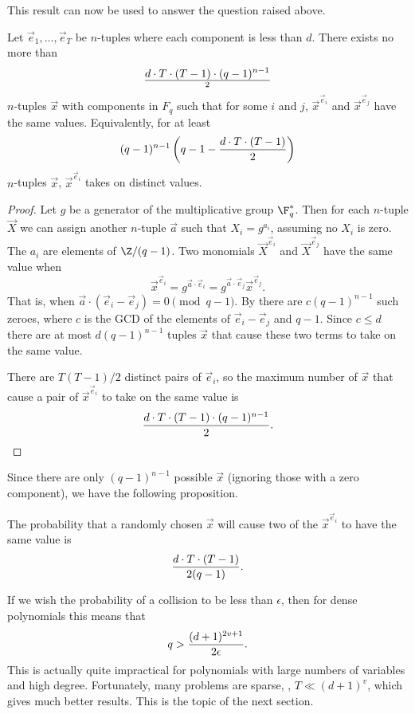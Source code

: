 This result can now be used to answer the question raised above.

\begin{proposition}
\label{Interp:8:Prop}
Let $\vec e_1, \ldots, \vec e_T$ be $n$-tuples where each component is less
than $d$.  There exists no more than
\[
d \cdot T \cdot (T-1) \cdot (q-1)^{n-1} \over 2
\]
$n$-tuples $\vec x$ with components in $F_q$ such that for some $i$
and $j$, $\vec{x}^{\vec{e}_i}$ and $\vec{x}^{\vec{e}_j}$ have the same
values.  Equivalently, for at least
\[
(q-1)^{n-1} \left(q - 1 - {d \cdot T \cdot (T-1) \over 2}\right)
\]
$n$-tuples $\vec{x}$, $\vec{x}^{\vec{e}_i}$ takes on distinct values.
\end{proposition}

\begin{proof}
Let $g$ be a generator of the multiplicative group $\F_q^{\ast}$.  Then
for each $n$-tuple $\vec X$ we can assign another $n$-tuple $\vec a$ such that
$X_i = g^{a_i}$, assuming no $X_i$ is zero.  The $a_i$ are elements of
$\Z/(q-1)$.  Two monomials $\vec X^{\vec e_i}$ and $\vec X^{\vec e_j}$ have the
same value when 
\[
\vec x^{\vec e_i} = g^{\vec a \cdot \vec e_i} = g^{\vec a \cdot \vec e_j}
\vec x^{\vec e_j}.
\]
That is, when $\vec a \cdot (\vec e_i - \vec e_j) = 0 \pmod{q-1}$.  By
 there are $c (q -1)^{n-1}$ such zeroes,
where $c$ is the GCD of the elements of $\vec e_i - \vec e_j$ and $q-1$.
Since $c \le d$ there are at most $d (q -1)^{n-1}$ tuples $\vec x$ that
cause these two terms to take on the same value.

There are $T(T-1)/2$ distinct pairs of $\vec e_i$, so the maximum number of
$\vec x$ that cause a pair of $\vec x^{\vec e_i}$ to take on the same value is
\[
{d \cdot T \cdot (T-1) \cdot (q-1)^{n-1} \over 2}.
\]
\end{proof}


Since there are only $(q-1)^{n-1}$ possible $\vec x$ (ignoring those
with a zero component), we have the following proposition.

\begin{proposition}
\label{Vandermonde:Vec:Indep:Prop}
The probability that a randomly chosen $\vec x$ will cause two of the $\vec
x^{\vec e_i}$ to have the same value is
\[
{d \cdot T \cdot (T-1) \over 2 (q - 1)}.
\]
\end{proposition}

If we wish the probability of a collision to be less than $\epsilon$, then
for dense polynomials this means that 
\[
q > {(d+1)^{2v+1} \over 2 \epsilon}.
\]
This is actually quite impractical for polynomials with large numbers
of variables and high degree.  Fortunately, many problems are sparse,
\ie,  $T \ll (d+1)^v$, which gives much better results.  This is the
topic of the next section.

